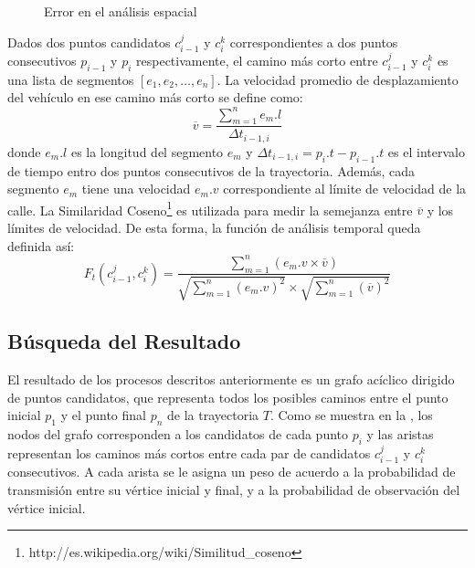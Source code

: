 \begin{figure}[h*]
	\centering
	
	\caption{\label{fig:analisis_temporal} Error en el análisis espacial}	
\end{figure}

Dados dos puntos candidatos $c_{i-1}^{j}$ y $c_{i}^{k}$ correspondientes a dos puntos consecutivos $p_{i-1}$ y $p_i$ respectivamente, el camino más corto entre $c_{i-1}^{j}$ y $c_{i}^{k}$ es una lista de segmentos $[e_1, e_2, \dots, e_n]$. La velocidad promedio de desplazamiento del vehículo en ese camino más corto se define como:
\begin{equation}
\overline{v} = \frac { \sum_{m=1}^{n} {e_m.l} }{ \Delta t_{i-1, i} }
\end{equation}
donde $e_m.l$ es la longitud del segmento $e_m$ y $\Delta t_{i-1, i} = p_i.t - p_{i-1}.t$ es el intervalo de tiempo entro dos puntos consecutivos de la trayectoria. Además, cada segmento $e_m$ tiene una velocidad $e_m.v$ correspondiente al límite de velocidad de la calle. La Similaridad Coseno\footnote{http://es.wikipedia.org/wiki/Similitud\_coseno} es utilizada para medir la semejanza entre $\overline{v}$ y los límites de velocidad. De esta forma, la función de análisis temporal queda definida así:
\begin{equation} \label{funcion_temporal}
F_{ t }(c_{ i-1 }^{ j },c_{ i }^{ k })=\frac { \sum _{ m=1 }^{ n }{ (e_{ m }.v\times \overline { v } ) }  }{ \sqrt { \sum _{ m=1 }^{ n }{ (e_{ m }.v)^{ 2 } }  } \times \sqrt { \sum _{ m=1 }^{ n }{ (\overline { v } )^{ 2 } }  }  } 
\end{equation}

\subsection{Búsqueda del Resultado}

\label{busqueda_de_resultado}
El resultado de los procesos descritos anteriormente es un grafo acíclico dirigido de puntos candidatos, que representa todos los posibles caminos entre el punto inicial $p_1$ y el punto final $p_n$ de la trayectoria $T$. Como se muestra en la , los nodos del grafo corresponden a los candidatos de cada punto $p_i$ y las aristas representan los caminos más cortos entre cada par de candidatos $c_{i-1}^j$ y $c_i^k$ consecutivos. A cada arista se le asigna un peso de acuerdo a la probabilidad de transmisión entre su vértice inicial y final, y a la probabilidad de observación del vértice inicial.


